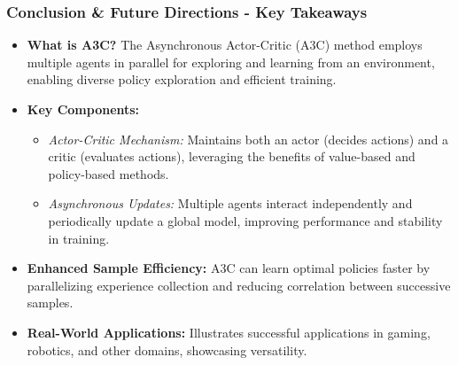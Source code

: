 \documentclass{beamer}
\begin{document}
\begin{frame}[fragile]
    \frametitle{Conclusion \& Future Directions - Key Takeaways}
    \begin{itemize}
        \item \textbf{What is A3C?}  
        The Asynchronous Actor-Critic (A3C) method employs multiple agents in parallel for exploring and learning from an environment, enabling diverse policy exploration and efficient training.
        
        \item \textbf{Key Components:}
        \begin{itemize}
            \item \textit{Actor-Critic Mechanism:} Maintains both an actor (decides actions) and a critic (evaluates actions), leveraging the benefits of value-based and policy-based methods.
            \item \textit{Asynchronous Updates:} Multiple agents interact independently and periodically update a global model, improving performance and stability in training.
        \end{itemize}
        
        \item \textbf{Enhanced Sample Efficiency:}  
        A3C can learn optimal policies faster by parallelizing experience collection and reducing correlation between successive samples.
        
        \item \textbf{Real-World Applications:}  
        Illustrates successful applications in gaming, robotics, and other domains, showcasing versatility.
    \end{itemize}
\end{frame}
\end{document}

